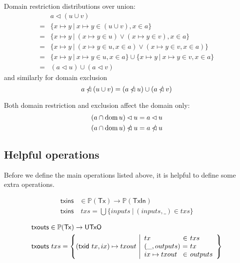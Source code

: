 \documentclass{article}
\newcommand{\powerset}[1]{\mathbb{P}(#1)}
\DeclareMathOperator{\dom}{dom}
\newcommand{\restrictdom}{\lhd}
\newcommand{\subtractdom}{\mathbin{\slashed{\restrictdom}}}
\begin{document}
Domain restriction distributions over union:
%
\begin{equation} \label{restrictdom_union}
\begin{split}
& a \restrictdom (u \cup v) \\
= & \{ x \mapsto y ~|~ x \mapsto y \in (u \cup v), x \in a \} \\
= & \{ x \mapsto y ~|~ (x \mapsto y \in u) \vee (x \mapsto y \in v), x \in a \} \\
= & \{ x \mapsto y ~|~ (x \mapsto y \in u, x \in a) \vee (x \mapsto y \in v, x \in a) \} \\
= & \{ x \mapsto y ~|~ x \mapsto y \in u, x \in a \} \cup \{ x \mapsto y ~|~ x \mapsto y \in v, x \in a \} \\
= & (a \restrictdom u) \cup (a \restrictdom v)
\end{split}
\end{equation}
%
and similarly for domain exclusion
%
\begin{equation} \label{subtractdom_union}
a \subtractdom (u \cup v) = (a \subtractdom u) \cup (a \subtractdom v)
\end{equation}

Both domain restriction and exclusion affect the domain only:
%
\begin{align}
(a \cap \dom u) \restrictdom u & = a \restrictdom u \label{restrictdom_dom} \\
(a \cap \dom u) \subtractdom u & = a \subtractdom u \label{subtractdom_dom}
\end{align}


\subsection{Helpful operations}

Before we define the main operations listed above, it is helpful to define some
extra operations.

\begin{equation}
\begin{split}
\mathsf{txins}& \in \powerset{\mathsf{Tx}} \to \powerset{\mathsf{TxIn}} \\
\mathsf{txins}& ~ txs = \bigcup \{ inputs ~|~ (inputs, \_) \in txs \}
\end{split}
\end{equation}

\begin{equation}
\begin{split}
\mathsf{txouts}&\in \powerset{\mathsf{Tx}} \to \mathsf{UTxO} \\
\mathsf{txouts}& ~ txs =
  \left\{ (\mathsf{txid} ~ tx, ix) \mapsto txout ~
  \middle| \begin{array}{l@{~}c@{~}l}
             tx & \in & txs \\
             (\_, outputs) & = & tx \\
             ix \mapsto txout & \in & outputs
           \end{array}
  \right\}
\end{split}
\end{equation}
\end{document}
